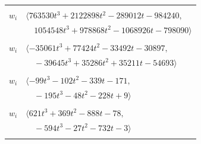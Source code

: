 \documentclass[11pt]{article}
\begin{document}
\begin{longtable}{@{}ll@{}}
\addlinespace[2pt]
\multicolumn{2}{@{}p{0.97\textwidth}@{}}{$i=13$, $D_i=512$, $\rho_{ij}$: $3{:}2, \allowbreak 4{:}2, \allowbreak 8{:}1, \allowbreak 12{:}2, \allowbreak 17{:}1, \allowbreak 21{:}2, \allowbreak 30{:}1, \allowbreak 34{:}1, \allowbreak 37{:}2, \allowbreak 40{:}2, \allowbreak 46{:}2, \allowbreak 48{:}2, \allowbreak 49{:}1, \allowbreak 51{:}1, \allowbreak 61{:}2, \allowbreak 65{:}1, \allowbreak 68{:}2$}\\
$w_i$ & $\langle 763530t^{3}+2122898t^{2}-289012t-984240,$\\
 & $\quad 1054548t^{3}+978868t^{2}-1068926t-798090\rangle$\\
\addlinespace[2pt]
\multicolumn{2}{@{}p{0.97\textwidth}@{}}{$i=14$, $D_i=128$, $\rho_{ij}$: $19{:}2, \allowbreak 20{:}1, \allowbreak 23{:}2, \allowbreak 25{:}1, \allowbreak 26{:}1, \allowbreak 41{:}2, \allowbreak 42{:}1, \allowbreak 43{:}2, \allowbreak 47{:}2, \allowbreak 57{:}2, \allowbreak 58{:}2, \allowbreak 61{:}2, \allowbreak 67{:}1, \allowbreak 69{:}1, \allowbreak 70{:}2$}\\
$w_i$ & $\langle -35061t^{3}+77424t^{2}-33492t-30897,$\\
 & $\quad -39645t^{3}+35286t^{2}+35211t-54693\rangle$\\
\addlinespace[2pt]
\multicolumn{2}{@{}p{0.97\textwidth}@{}}{$i=15$, $D_i=16$, $\rho_{ij}$: $30{:}1, \allowbreak 38{:}2, \allowbreak 39{:}2, \allowbreak 41{:}1, \allowbreak 42{:}1, \allowbreak 45{:}2, \allowbreak 54{:}1, \allowbreak 56{:}2, \allowbreak 59{:}1, \allowbreak 67{:}2, \allowbreak 70{:}1$}\\
$w_i$ & $\langle -99t^{3}-102t^{2}-339t-171,$\\
 & $\quad -195t^{3}-48t^{2}-228t+9\rangle$\\
\addlinespace[2pt]
\multicolumn{2}{@{}p{0.97\textwidth}@{}}{$i=16$, $D_i=8$, $\rho_{ij}$: $7{:}2, \allowbreak 10{:}2, \allowbreak 20{:}1, \allowbreak 29{:}1, \allowbreak 30{:}2, \allowbreak 36{:}1, \allowbreak 41{:}1, \allowbreak 46{:}2, \allowbreak 47{:}1, \allowbreak 48{:}2, \allowbreak 58{:}1, \allowbreak 65{:}1, \allowbreak 70{:}2$}\\
$w_i$ & $\langle 621t^{3}+369t^{2}-888t-78,$\\
 & $\quad -594t^{3}-27t^{2}-732t-3\rangle$\\
\addlinespace[2pt]
\multicolumn{2}{@{}p{0.97\textwidth}@{}}{$i=17$, $D_i=4$, $\rho_{ij}$: $2{:}1, \allowbreak 5{:}2, \allowbreak 6{:}1, \allowbreak 7{:}1, \allowbreak 13{:}2, \allowbreak 36{:}1, \allowbreak 39{:}2, \allowbreak 58{:}2$}\\

\end{longtable}
\end{document}
